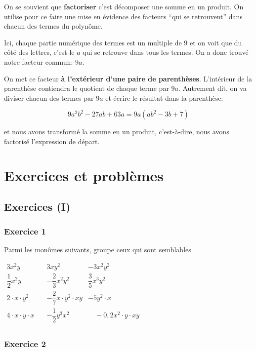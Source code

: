 \documentclass[
  12pt,
]{book}
\begin{document}
On se souvient que \textbf{factoriser} c'est décomposer une somme en un produit. On utilise pour ce faire une mise en évidence des facteurs ``qui se retrouvent'' dans chacun des termes du polynôme.

Ici, chaque partie numérique des termes est un multiple de \(9\) et on voit que du côté des lettres, c'est le \(a\) qui se retrouve dans tous les termes. On a donc trouvé notre facteur commun: \(9a\).

On met ce facteur \textbf{à l'extérieur d'une paire de parenthèses}. L'intérieur de la parenthèse contiendra le quotient de chaque terme par \(9a\). Autrement dit, on va diviser chacun des termes par \(9a\) et écrire le résultat dans la parenthèse:

\[9a^2b^2-27ab+63a=9a(ab^2-3b+7)\]

et nous avons transformé la somme en un produit, c'est-à-dire, nous avons factorisé l'expression de départ.

\hypertarget{exercices-et-probluxe8mes-1}{%
\section{Exercices et problèmes}\label{exercices-et-probluxe8mes-1}}

\hypertarget{exercices-i-1}{%
\subsection{Exercices (I)}\label{exercices-i-1}}

\hypertarget{exercice-1-2}{%
\subsubsection*{Exercice 1}\label{exercice-1-2}}

Parmi les monômes suivants, groupe ceux qui sont semblables

\(\begin{array}{lcr} 3x^2y & 3xy^2 & -3x^2y^2\\ \dfrac{1}{2}x^2y & -\dfrac{2}{3}x^2y^2 & \dfrac{3}{5}x^3y^2\\ 2\cdot x \cdot y^2 & -\dfrac{2}{7}x\cdot y^2\cdot xy & -5y^2\cdot x\\ 4\cdot x\cdot y\cdot x\quad & -\dfrac{1}{2}y^3x^2 &\quad -0{,}2x^2\cdot y\cdot xy\\ \end{array}\)

\hypertarget{exercice-2-1}{%
\subsubsection*{Exercice 2}\label{exercice-2-1}}
\end{document}
